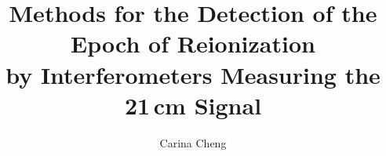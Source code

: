 \title{Methods for the Detection of the Epoch of Reionization \\ by Interferometers Measuring the 21\,cm Signal}
\author{Carina Cheng} %
